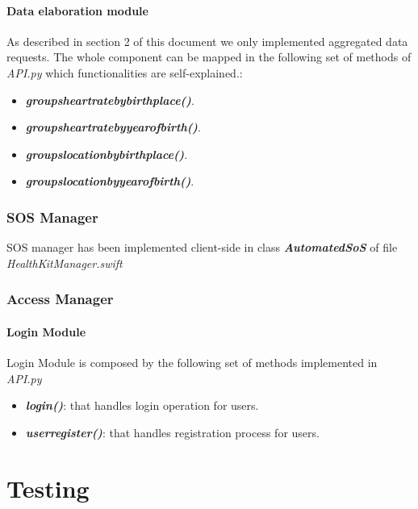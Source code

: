 \documentclass{article}
\begin{document}
\paragraph{Data elaboration module}
As described in section 2 of this document we only implemented aggregated data requests. The whole component can be mapped in the following set of methods of \textit{API.py} which functionalities are self-explained.:
\begin{itemize}
	\item \textit{\textbf{groups\textunderscore heart\textunderscore rate\textunderscore by\textunderscore birth\textunderscore place()}}.
	\item \textit{\textbf{groups\textunderscore heart\textunderscore rate\textunderscore by\textunderscore year\textunderscore of\textunderscore birth()}}.
	\item \textit{\textbf{groups\textunderscore location\textunderscore by\textunderscore birth\textunderscore place()}}.
	\item \textit{\textbf{groups\textunderscore location\textunderscore by\textunderscore year\textunderscore of\textunderscore birth()}}.
\end{itemize}  

\subsubsection{SOS Manager}
SOS manager has been implemented client-side in class \textbf{\textit{AutomatedSoS}} of file \textit{HealthKitManager.swift}

\subsubsection{Access Manager}
\paragraph{Login Module}
Login Module is composed by the following set of methods implemented in \textit{API.py}
\begin{itemize}
	\item \textit{\textbf{login()}}: that handles login operation for users.
	\item \textit{\textbf{user\textunderscore register()}}: that handles registration process for users.
\end{itemize}

\section{Testing}
\end{document}
